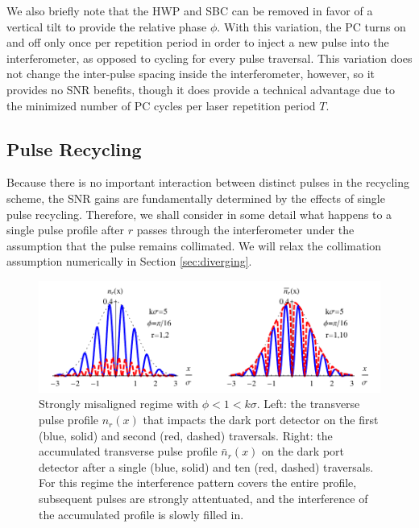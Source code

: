 We also briefly note that the HWP and SBC can be removed in favor of a vertical tilt to provide the relative phase $\phi$.  With this variation, the PC turns on and off only once per repetition period in order to inject a new pulse into the interferometer, as opposed to cycling for every pulse traversal.  This variation does not change the inter-pulse spacing inside the interferometer, however, so it provides no SNR benefits, though it does provide a technical advantage due to the minimized number of PC cycles per laser repetition period $T$.

\subsection{Pulse Recycling}
Because there is no important interaction between distinct pulses in the recycling scheme, the SNR gains are fundamentally determined by the effects of single pulse recycling.  Therefore, we shall consider in some detail what happens to a single pulse profile after $r$ passes through the interferometer under the assumption that the pulse remains collimated.  We will relax the collimation assumption numerically in Section \ref{sec:diverging}. 

\begin{figure}[th]
  \begin{center}
    \includegraphics[width=6in]{PulsedRecycling/Figures/beam1.pdf}
  \end{center}
  \caption{Strongly misaligned regime with $\phi < 1 < k\sigma$.  Left: the transverse pulse profile $n_r(x)$ that impacts the dark port detector on the first (blue, solid) and second (red, dashed) traversals.  Right: the accumulated transverse pulse profile $\bar{n}_r(x)$ on the dark port detector after a single (blue, solid) and ten (red, dashed) traversals.  For this regime the interference pattern covers the entire profile, subsequent pulses are strongly attentuated, and the interference of the accumulated profile is slowly filled in. }
  \label{fig:beam1}
\end{figure}


